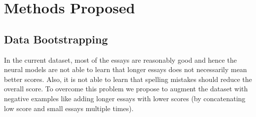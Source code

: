 \documentclass[11pt,a4paper]{article}
\begin{document}
\begin{table}[]
  \centering
  \caption{Effect of spelling mistakes, grammatical errors and poor organization in terms of QWK between old predicted scores and new predicted scores}
  \label{spell_word_sentence}
  \end{table}


\section{Methods Proposed}

\subsection{Data Bootstrapping}
In the current dataset, most of the essays are reasonably good and hence the neural models are not able to learn that longer essays does not necessarily mean better scores. Also, it is not able to learn that spelling mistakes should reduce the overall score.
To overcome this problem we propose to augment the dataset with negative examples like adding longer essays with lower scores (by concatenating low score and small essays multiple times).  
\end{document}
